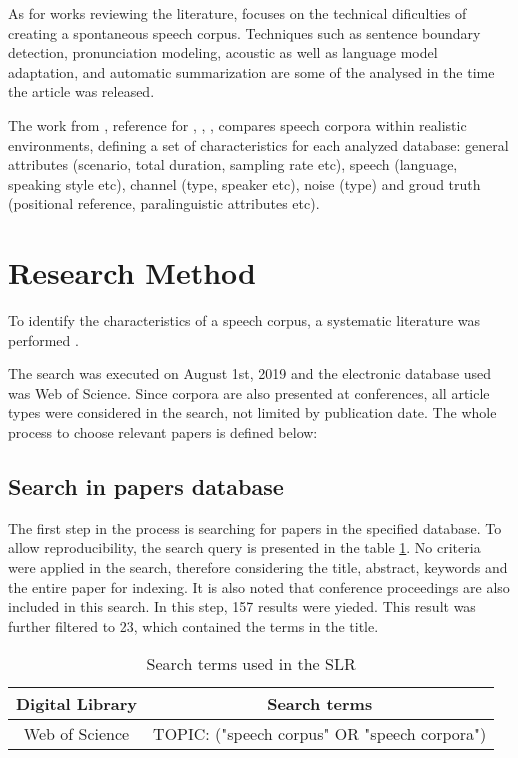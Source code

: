\documentclass[conference]{IEEEtran}
\begin{document}
As for works reviewing the literature, \cite{furui2005recent} focuses on the technical dificulties of creating a spontaneous speech corpus. Techniques such as sentence boundary detection, pronunciation modeling, acoustic as well as language model adaptation, and automatic summarization are some of the analysed in the time the article was released.

The work from \cite{LeRouxVincent2014TRdatasets}, reference for \cite{8423508}, \cite{Gannot:2017:CPM:3105654.3105658}, \cite{RODOMAGOULAKIS2017419}, compares speech corpora within realistic environments, defining a set of characteristics for each analyzed database: general attributes (scenario, total duration, sampling rate etc), speech (language, speaking style etc), channel (type, speaker etc), noise (type) and groud truth (positional reference, paralinguistic attributes etc).

\section[Research Method]{Research Method}

To identify the characteristics of a speech corpus, a systematic literature was performed \cite{kitchenham2009systematic}.

The search was executed on August 1st, 2019 and the electronic database used was Web of Science. Since corpora are also presented at conferences, all article types were considered in the search, not limited by publication date. The whole process to choose relevant papers is defined below:

\subsection{Search in papers database}

The first step in the process is searching for papers in the specified database. To allow reproducibility, the search query is presented in the table \ref{tab:search-terms}. No criteria were applied in the search, therefore considering the title, abstract, keywords and the entire paper for indexing. It is also noted that conference proceedings are also included in this search. In this step, 157 results were yieded. This result was further filtered to 23, which contained the terms in the title.

\begin{table}[h]
    \centering
    \begin{tabular}{|c|c|}
        \hline Digital Library & Search terms \\ \hline
        Web of Science & TOPIC: ("speech corpus" OR "speech corpora")  \\ \hline
    \end{tabular}
    \caption{Search terms used in the SLR}
    \label{tab:search-terms}
\end{table}
\end{document}
